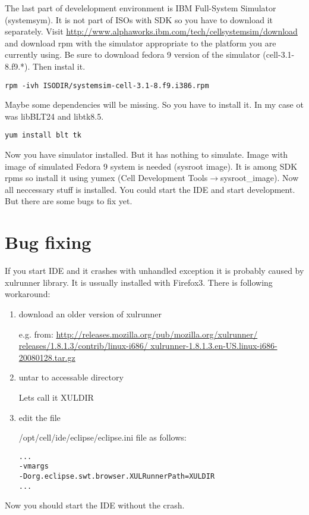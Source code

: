 The last part of develelopment environment is IBM Full-System Simulator (systemsym). It is not part of ISOs with SDK so you have to download it separately. Visit \url{http://www.alphaworks.ibm.com/tech/cellsystemsim/download} and download rpm with the simulator appropriate to the platform you are currently using. Be sure to download fedora 9 version of the simulator (cell-3.1-8.f9.*). Then instal it.

\begin{verbatim}
rpm -ivh ISODIR/systemsim-cell-3.1-8.f9.i386.rpm
\end{verbatim}

Maybe some dependencies will be missing. So you have to install it. In my case ot was libBLT24 and libtk8.5.

\begin{verbatim}
yum install blt tk
\end{verbatim}

Now you have simulator installed. But it has nothing to simulate. Image with image of simulated Fedora 9 system is needed (sysroot image). It is among SDK rpms so install it using yumex (Cell Development Tools$\rightarrow$sysroot\_image).
Now all neccessary stuff is installed. You could start the IDE and start development. But there are some bugs to fix yet. 

\section{Bug fixing}

If you start IDE and it crashes with unhandled exception it is probably caused by xulrunner library. It is ussually installed with Firefox3. There is following workaround:
\begin{enumerate}
\item download an older version of xulrunner

e.g. from: \url{http://releases.mozilla.org/pub/mozilla.org/xulrunner/ releases/1.8.1.3/contrib/linux-i686/ xulrunner-1.8.1.3.en-US.linux-i686-20080128.tar.gz}

\item untar to accessable directory

Lets call it XULDIR

\item edit the file

/opt/cell/ide/eclipse/eclipse.ini file as follows:
\begin{verbatim}
...
-vmargs
-Dorg.eclipse.swt.browser.XULRunnerPath=XULDIR
...
\end{verbatim}
\end{enumerate}
Now you should start the IDE without the crash.


